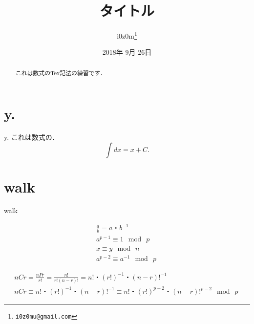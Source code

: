 \documentclass{ltjsarticle}
\begin{document}
\title{タイトル}
\author{i0z0m\thanks{\texttt{i0z0mu@gmail.com}}}
\date{2018年 9月 26日}
\maketitle

\begin{abstract}
これは数式のTex記法の練習です．
\end{abstract}

\section{y.}
y.\cite{y.}
これは数式の．
\[ \int dx = x + C. \]

\section{walk}
walk\cite{walk}

\begin{eqnarray*}
  \frac{a}{b}=a・b^{-1}\ \\
  a^{p-1}\equiv1 \mod \ p\ \\
  x \equiv y \mod \ n\ \\
  a^{p-2}\equiv a^{-1} \mod \ p\
\end{eqnarray*}

\begin{eqnarray*}
  nCr=\frac{nPr}{r!} = \frac{n!}{r!(n-r)!}=n!・(r!)^{-1}・(n-r)!^{-1}\ \\
  nCr\equiv n!・(r!)^{-1}・(n-r)!^{-1}\equiv n!・(r!)^{p-2}・(n-r)!^{p-2} \mod \ p\
\end{eqnarray*}

\printbibliography
\end{document}
